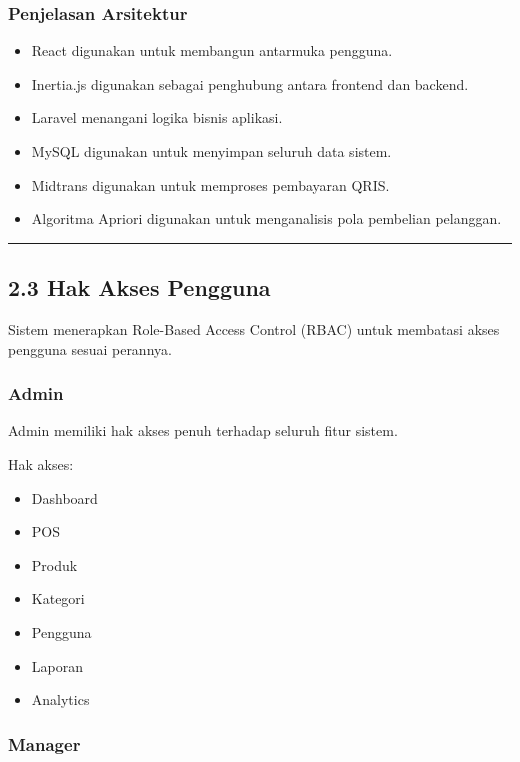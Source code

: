 \subsubsection{Penjelasan Arsitektur}\label{penjelasan-arsitektur}

\begin{itemize}
\tightlist
\item
  React digunakan untuk membangun antarmuka pengguna.
\item
  Inertia.js digunakan sebagai penghubung antara frontend dan backend.
\item
  Laravel menangani logika bisnis aplikasi.
\item
  MySQL digunakan untuk menyimpan seluruh data sistem.
\item
  Midtrans digunakan untuk memproses pembayaran QRIS.
\item
  Algoritma Apriori digunakan untuk menganalisis pola pembelian pelanggan.
\end{itemize}

\begin{center}\rule{0.5\linewidth}{0.5pt}\end{center}

\subsection{2.3 Hak Akses Pengguna}\label{hak-akses-pengguna}

Sistem menerapkan Role-Based Access Control (RBAC) untuk membatasi akses pengguna sesuai perannya.

\subsubsection{Admin}\label{admin}

Admin memiliki hak akses penuh terhadap seluruh fitur sistem.

Hak akses:

\begin{itemize}
\tightlist
\item
  Dashboard
\item
  POS
\item
  Produk
\item
  Kategori
\item
  Pengguna
\item
  Laporan
\item
  Analytics
\end{itemize}

\subsubsection{Manager}\label{manager}

